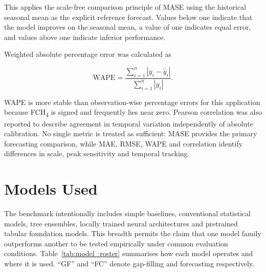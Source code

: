 This applies the scale-free comparison principle of MASE
\cite{hyndman2006accuracy} using the historical seasonal mean as the explicit
reference forecast. Values below one indicate that the model improves on the
seasonal mean, a value of one indicates equal error, and values above one
indicate inferior performance.

Weighted absolute percentage error was calculated as

\begin{equation}
\mathrm{WAPE}
=
\frac{
\sum_{i=1}^{n}|y_i-\hat{y}_i|
}{
\sum_{i=1}^{n}|y_i|
}.
\end{equation}

WAPE is more stable than observation-wise percentage errors for this
application because FCH\textsubscript{4} is signed and frequently lies near
zero. Pearson correlation was also reported to describe agreement in temporal
variation independently of absolute calibration. No single metric is treated
as sufficient: MASE provides the primary forecasting comparison, while MAE,
RMSE, WAPE and correlation identify differences in scale, peak sensitivity and
temporal tracking.

\section{Models Used}
\label{sec:model_roster}

The benchmark intentionally includes simple baselines, conventional statistical
models, tree ensembles, locally trained neural architectures and pretrained
tabular foundation models. This breadth permits the claim that one model
family outperforms another to be tested empirically under common evaluation
conditions. Table~\ref{tab:model_roster} summarises how each model operates and
where it is used. ``GF'' and ``FC'' denote gap-filling and forecasting 
respectively.



